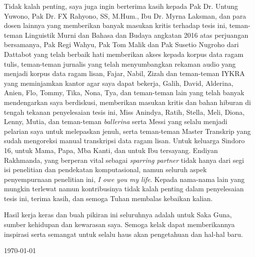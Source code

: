 Tidak kalah penting, saya juga ingin berterima kasih kepada Pak Dr. Untung Yuwono, Pak Dr. FX Rahyono, SS, M.Hum., Ibu Dr. Myrna Laksman, dan para dosen lainnya yang memberikan banyak masukan kritis terhadap tesis ini, teman-teman Linguistik Murni dan Bahasa dan Budaya angkatan 2016 atas perjuangan bersamanya, Pak Regi Wahyu, Pak Tom Malik dan Pak Susetio Nugroho dari Dattabot yang telah berbaik hati memberikan akses kepada korpus data ragam tulis, teman-teman jurnalis yang telah menyumbangkan rekaman audio yang menjadi korpus data ragam lisan, Fajar, Nabil, Zizah dan teman-teman IYKRA yang meminjamkan kantor agar saya dapat bekerja, Galih, David, Alderina, Anien, Flo, Tommy, Tika, Nona, Tya, dan teman-teman lain yang telah banyak mendengarkan saya berdiskusi, memberikan masukan kritis dan bahan hiburan di tengah tekanan penyelesaian tesis ini, Miss Anindya, Ratih, Stella, Meli, Diona, Lenny, Mutia, dan teman-teman \textit{ballerina} serta Messi yang selalu menjadi pelarian saya untuk melepaskan jenuh, serta teman-teman Master Transkrip yang sudah mengoreksi manual transkripsi data ragam lisan. Untuk keluarga Sindoro 16, untuk Mama, Papa, Mba Kanti, dan untuk Ibu tersayang. Endiyan Rakhmanda, yang berperan vital sebagai \textit{sparring partner} tidak hanya dari segi isi penelitian dan pendekatan komputasional, namun seluruh aspek penyempurnaan penelitian ini, \textit{I owe you my life}. Kepada nama-nama lain yang mungkin terlewat namun kontribusinya tidak kalah penting dalam penyelesaian tesis ini, terima kasih, dan semoga Tuhan membalas kebaikan kalian.

Hasil kerja keras dan buah pikiran ini seluruhnya adalah untuk Saka Guna, sumber kehidupan dan kewarasan saya. Semoga kelak dapat memberikannya inspirasi serta semangat untuk selalu haus akan pengetahuan dan hal-hal baru.

\vspace*{0.1cm}
\begin{flushright}
\today\\[0.1cm]
\vspace*{1cm}
\penulis

\end{flushright}